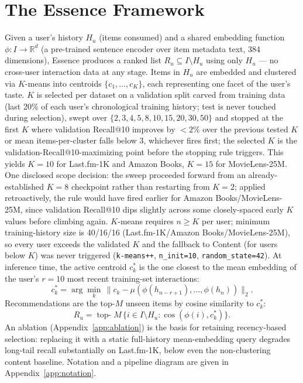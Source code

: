 \documentclass{article}
\begin{document}
\section{The Essence Framework}
\label{sec:framework}

Given a user's history $H_u$ (items consumed) and a shared embedding function $\phi: I \to \mathbb{R}^d$ (a pre-trained sentence encoder over item metadata text, 384 dimensions), Essence produces a ranked list $R_u \subseteq I \setminus H_u$ using only $H_u$ --- no cross-user interaction data at any stage. Items in $H_u$ are embedded and clustered via $K$-means into centroids $\{c_1,\ldots,c_K\}$, each representing one facet of the user's taste. $K$ is selected per dataset on a validation split carved from training data (last 20\% of each user's chronological training history; test is never touched during selection), swept over $\{2,3,4,5,8,10,15,20,30,50\}$ and stopped at the first $K$ where validation Recall@10 improves by $<2\%$ over the previous tested $K$ or mean items-per-cluster falls below 3, whichever fires first; the selected $K$ is the validation-Recall@10-maximizing point before the stopping rule triggers. This yields $K=10$ for Last.fm-1K and Amazon Books, $K=15$ for MovieLens-25M. One disclosed scope decision: the sweep proceeded forward from an already-established $K=8$ checkpoint rather than restarting from $K=2$; applied retroactively, the rule would have fired earlier for Amazon Books/MovieLens-25M, since validation Recall@10 dips slightly across some closely-spaced early $K$ values before climbing again. $K$-means requires $n\geq K$ per user; minimum training-history size is 40/16/16 (Last.fm-1K/Amazon Books/MovieLens-25M), so every user exceeds the validated $K$ and the fallback to Content (for users below $K$) was never triggered (\texttt{k-means++}, \texttt{n\_init=10}, \texttt{random\_state=42}). At inference time, the active centroid $c_k^*$ is the one closest to the mean embedding of the user's $r=10$ most recent training-set interactions:
\begin{equation}
  c_k^* = \arg\min_k \, \bigl\| c_k - \mu(\phi(h_{n-r+1}), \ldots, \phi(h_n)) \bigr\|_2 .
  \label{eq:active}
\end{equation}
Recommendations are the top-$M$ unseen items by cosine similarity to $c_k^*$:
\begin{equation}
  R_u = \operatorname{top-}M \, \bigl\{ i \in I \setminus H_u : \cos(\phi(i), c_k^*) \bigr\} .
  \label{eq:reco}
\end{equation}
An ablation (Appendix~\ref{app:ablation}) is the basis for retaining recency-based selection: replacing it with a static full-history mean-embedding query degrades long-tail recall substantially on Last.fm-1K, below even the non-clustering content baseline. Notation and a pipeline diagram are given in Appendix~\ref{app:notation}.
\end{document}
